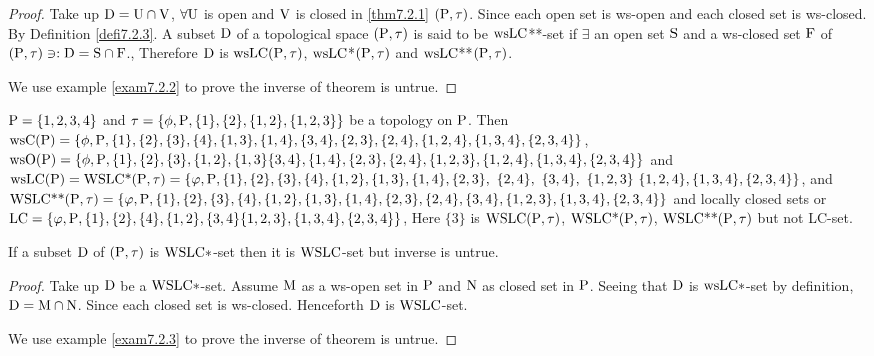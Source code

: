 \begin{proof}
Take up $\mathrm{D} = \mathrm{U} \cap \mathrm{V}$, $\forall \mathrm{U}$ is open and $\mathrm{V}$ is closed in \ref{thm7.2.1} $(\mathrm{P}, \tau)$. Since each open set is ws-open and each closed set is ws-closed. By Definition \ref{defi7.2.3}. A subset $\mathrm{D}$ of a topological space $(\mathrm{P}, \tau)$ is said to be $\mathrm{ws}\mathrm{LC}${*}{*}-set if $\exists$ an open set $\mathrm{S}$ and a ws-closed set $\mathrm{F}$ of $(\mathrm{P}, \tau) \ni: \mathrm{D} = \mathrm{S}\cap \mathrm{F}$., Therefore $\mathrm{D}$ is $\mathrm{ws}\mathrm{LC} (\mathrm{P}, \tau)$, $\mathrm{ws}\mathrm{LC}$*$(\mathrm{P}, \tau)$ and $\mathrm{ws}\mathrm{LC}${*}{*}$(\mathrm{P}, \tau)$.

We use example \ref{exam7.2.2} to prove the inverse of theorem is untrue.
\end{proof}

\begin{exm}\label{exam7.2.2}
$\mathrm{P} = \{1, 2, 3, 4\}$ and $\tau = \{\phi, \mathrm{P}, \{1\}, \{2\}, \{1, 2\}, \{1,2, 3\}\}$ be a topology on $\mathrm{P}$. Then $\ws\TSC(\TSP) = \{\phi, \TSP, \{1\}, \{2\}, \{3\}, \{4\}, \{1,3\}, \{1,4\},\{3,4\},\{2,3\}, \{2,4\},\break \{1,2, 4\},\{1,3,4\},\{2,3,4\}\}$, $\ws\TSO(\TSP) = \{\phi, \TSP, \{1\}, \{2\}, \{3\},\{1,2\},\{1,3\} \{3,4\}, \{1,4\},\break \{2,3\}, \{2,4\}, \{1,2,3\},\{1,2,4\},\{1,3,4\},\{2,3,4\}\}$ and $\ws\TSL\TSC(\TSP)= \WSLC\text{*}(\TSP, \tau) = \{\varphi, \TSP ,\{1\}, \{2\}, \{3\},\{4\},\{1,2\},\{1,3\}, \{1,4\}, \{2,3\},~\{2,4\},~\{3,4\},~\{1, 2, 3\}~\{1,2,4\},\break \{1,3,4\},\{2,3,4\}\}$, and
$\WSLC\text{{*}{*}}(\TSP, \tau)= \{\varphi, \TSP ,\{1\}, \{2\}, \{3\},\{4\},\{1,2\},\{1,3\},\break \{1,4\}, \{2,3\}, \{2,4\},\{3,4\}, \{1, 2,3\},\{1,3,4\},\{2,3,4\}\}$ and locally closed sets or $\mathrm{LC} = \{\varphi, \mathrm{P}, \{1\}, \{2\}, \{4\}, \{1,2\}, \{3, 4\}\{1,2,3\},\{1,3,4\},\{2,3,4\}\}$, Here $\{3\}$ is $\mathrm{WSLC} (\mathrm{P}, \tau)$, $\mathrm{WSLC}\text{*}(\mathrm{P}, \tau)$, $\mathrm{WSLC}\text{{*}{*}}(\mathrm{P}, \tau)$ but not LC-set.
\end{exm}

\begin{thm}\label{thm7.2.2}
If a subset $\mathrm{D}$ of $(\mathrm{P}, \tau)$ is $\mathrm{WSLC}*$-set then it is $\mathrm{WSLC}$-set but inverse is untrue.
\end{thm}

\begin{proof}
Take up $\mathrm{D}$ be a $\mathrm{WSLC}*$-set. Assume $\mathrm{M}$ as a ws-open set in $\mathrm{P}$ and $\mathrm{N}$ as closed set in $\mathrm{P}$. Seeing that $\mathrm{D}$ is $\mathrm{ws}\mathrm{LC}*$-set by definition, $\mathrm{D} = \mathrm{M} \cap \mathrm{N}$. Since each closed set is ws-closed. Henceforth $\mathrm{D}$ is $\mathrm{WSLC}$-set.

We use example \ref{exam7.2.3} to prove the inverse of theorem is untrue.
\end{proof}

